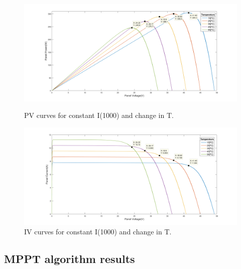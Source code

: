 \begin{figure}[H]
	\begin{minipage}[b]{0.55\linewidth}
		\centering
		\includegraphics[width=\textwidth]{../Pictures/PV_curves_1000_irradiance}
		\caption{PV curves for constant I(1000) and change in T.}
		\label{fig:PVcurves_Irr1000}
	\end{minipage}
	\hspace{0.5cm}
	\begin{minipage}[b]{0.55\linewidth}
		\centering
		\includegraphics[width=\textwidth]{../Pictures/IV_curves_1000_irradiance}
		\caption{IV curves for constant I(1000) and change in T.}
		\label{fig:IVcurves_Irr1000}
	\end{minipage}
\end{figure}

\subsection{MPPT algorithm results}


